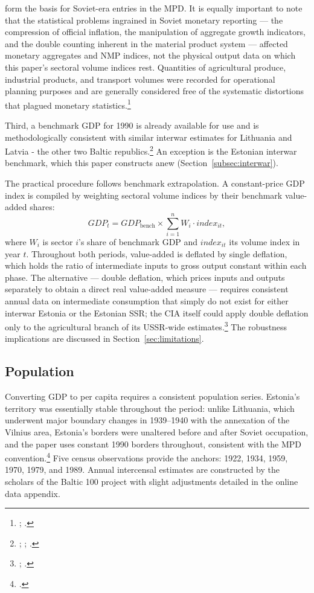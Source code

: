 \documentclass[12pt,a4paper]{article}
\begin{document}
form the basis for Soviet-era entries in the MPD. It is equally important to note that the statistical problems ingrained in Soviet monetary reporting — the compression of official inflation, the manipulation of aggregate growth indicators, and the double counting inherent in the material product system — affected monetary aggregates and NMP indices, not the physical output data on which this paper's sectoral volume indices rest. Quantities of agricultural produce, industrial products, and transport volumes were recorded for operational planning purposes and are generally considered free of the systematic distortions that plagued monetary statistics.\footnote{\autocite[279--280]{vonyoinmorys2021}; \autocite[307--308]{Maddison1998b}.}

Third, a benchmark GDP for 1990 is already available for use and is methodologically consistent with similar interwar estimates for Lithuania and Latvia - the other two Baltic republics.\footnote{\autocite{klimantas2019}; \autocite{norkuslatvia1935}; \autocite{bolotin1992}.} An exception is the Estonian interwar benchmark, which this paper constructs anew (Section~\ref{subsec:interwar}).

The practical procedure follows benchmark extrapolation. A constant-price GDP index is compiled by weighting sectoral volume indices by their benchmark value-added shares:
\[
    \mathit{GDP}_{t} = \mathit{GDP}_{\text{bench}} \times \sum_{i=1}^{n} W_{i} \cdot \mathit{index}_{it},
\]
where $W_{i}$ is sector $i$'s share of benchmark GDP and $\mathit{index}_{it}$ its volume index in year $t$. Throughout both periods, value-added is deflated by single deflation, which holds the ratio of intermediate inputs to gross output constant within each phase. The alternative — double deflation, which prices inputs and outputs separately to obtain a direct real value-added measure — requires consistent annual data on intermediate consumption that simply do not exist for either interwar Estonia or the Estonian SSR; the CIA itself could apply double deflation only to the agricultural branch of its USSR-wide estimates.\footnote{\autocite[45]{cia1982a}; \autocite[427--428]{thomasfeinstein2003}.} The robustness implications are discussed in Section~\ref{sec:limitations}.

\subsection{Population}
\label{subsec:population}

Converting GDP to per capita requires a consistent population series. Estonia's territory was essentially stable throughout the period: unlike Lithuania, which underwent major boundary changes in 1939--1940 with the annexation of the Vilnius area, Estonia's borders were unaltered before and after Soviet occupation, and the paper uses constant 1990 borders throughout, consistent with the MPD convention.\footnote{\autocite[30]{bolt_zanden_newgdp2021}.} Five census observations provide the anchors: 1922, 1934, 1959, 1970, 1979, and 1989. Annual intercensal estimates are constructed by the scholars of the Baltic 100 project with slight adjustments detailed in the online data appendix.
\end{document}
